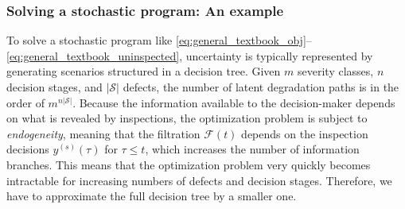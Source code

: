 \subsubsection{Solving a stochastic program: An example}
To solve a stochastic program like \cref{eq:general_textbook_obj}--\cref{eq:general_textbook_uninspected}, uncertainty is typically represented by generating scenarios structured in a decision tree.
Given $m$ severity classes, $n$ decision stages, and $|\mathcal S|$ defects, the number of latent degradation paths is in the order of $m^{n|\mathcal S|}$.
Because the information available to the decision-maker depends on what is revealed by inspections, the optimization problem is subject to \textit{endogeneity}, 
meaning that the filtration $\mathcal F(t)$ depends on the inspection decisions $y^{(s)}(\tau)$ for $\tau\le t$, which increases the number of information branches.
This means that the optimization problem very quickly becomes intractable for increasing numbers of defects and decision stages.
Therefore, we have to approximate the full decision tree by a smaller one.


